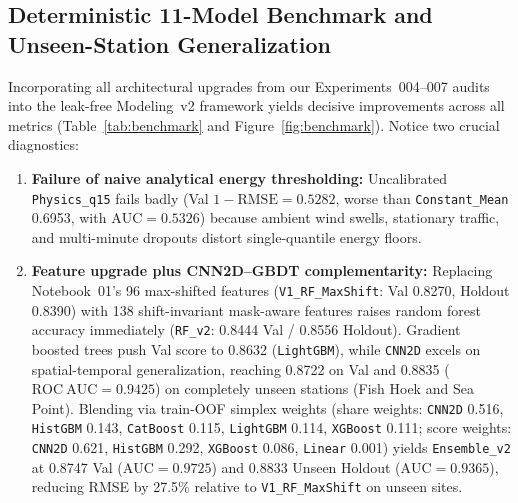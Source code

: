 \documentclass[10pt,a4paper]{article}
\begin{document}
\subsection{Deterministic 11-Model Benchmark and Unseen-Station Generalization}
Incorporating all architectural upgrades from our Experiments~004--007 audits into the leak-free Modeling~v2 framework yields decisive improvements across all metrics (Table~\ref{tab:benchmark} and Figure~\ref{fig:benchmark}). Notice two crucial diagnostics:
\begin{enumerate}
    \item \textbf{Failure of naive analytical energy thresholding:} Uncalibrated \texttt{Physics\_q15} fails badly (Val $1 - \mathrm{RMSE} = 0.5282$, worse than \texttt{Constant\_Mean} 0.6953, with $\mathrm{AUC} = 0.5326$) because ambient wind swells, stationary traffic, and multi-minute dropouts distort single-quantile energy floors.
    \item \textbf{Feature upgrade plus CNN2D--GBDT complementarity:} Replacing Notebook~01's 96 max-shifted features (\texttt{V1\_RF\_MaxShift}: Val 0.8270, Holdout 0.8390) with 138 shift-invariant mask-aware features raises random forest accuracy immediately (\texttt{RF\_v2}: 0.8444 Val / 0.8556 Holdout). Gradient boosted trees push Val score to 0.8632 (\texttt{LightGBM}), while \texttt{CNN2D} excels on spatial-temporal generalization, reaching 0.8722 on Val and 0.8835 ($\mathrm{ROC\ AUC} = 0.9425$) on completely unseen stations (Fish Hoek and Sea Point). Blending via train-OOF simplex weights (share weights: \texttt{CNN2D} 0.516, \texttt{HistGBM} 0.143, \texttt{CatBoost} 0.115, \texttt{LightGBM} 0.114, \texttt{XGBoost} 0.111; score weights: \texttt{CNN2D} 0.621, \texttt{HistGBM} 0.292, \texttt{XGBoost} 0.086, \texttt{Linear} 0.001) yields \texttt{Ensemble\_v2} at 0.8747 Val ($\mathrm{AUC} = 0.9725$) and 0.8833 Unseen Holdout ($\mathrm{AUC} = 0.9365$), reducing RMSE by 27.5\% relative to \texttt{V1\_RF\_MaxShift} on unseen sites.
\end{enumerate}
\end{document}

